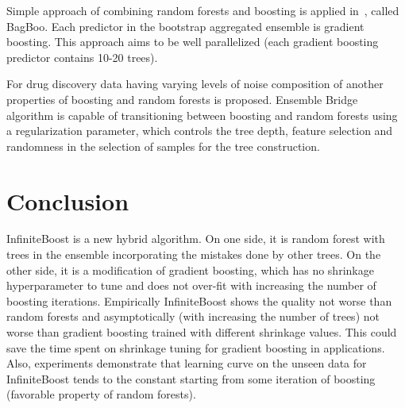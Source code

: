 Simple approach of combining random forests and boosting is applied in~\cite{key-bagboo}, called BagBoo. Each predictor in the bootstrap aggregated ensemble is gradient boosting. This approach aims to be well parallelized (each gradient boosting predictor contains 10-20 trees).

For drug discovery data having varying levels of noise composition of another properties of boosting and random forests is proposed. Ensemble Bridge~\cite{key-bridge} algorithm is capable of transitioning between boosting and random forests using a regularization parameter, which controls the tree depth, feature selection and randomness in the selection of samples for the tree construction. 

\section{Conclusion}
InfiniteBoost is a new hybrid algorithm. 
On one side, it is random forest with trees in the ensemble incorporating the mistakes done by other trees.
On the other side, it is a modification of gradient boosting, which has no shrinkage hyperparameter to tune and does not over-fit with increasing the number of boosting iterations.
Empirically InfiniteBoost shows the quality not worse than random forests and asymptotically (with increasing the number of trees) not worse than gradient boosting trained with different shrinkage values.
This could save the time spent on shrinkage tuning for gradient boosting in applications.
Also, experiments demonstrate that learning curve on the unseen data for InfiniteBoost tends to the constant starting from some iteration of boosting (favorable property of random forests).
\clearpagebiblio
